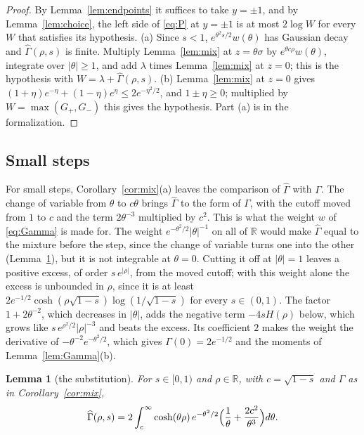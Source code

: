 \documentclass[12pt]{amsart}
\newtheorem{lemma}[theorem]{Lemma}
\theoremstyle{definition}
\numberwithin{equation}{section}
\newcommand{\R}{\mathbb{R}}
\newcommand{\Ghat}{\widehat{\Gamma}}
\newcommand{\leanmap}[1]{\ignorespaces}
\newcommand{\mapnote}[1]{\ignorespaces}
\begin{document}
\begin{proof}
By Lemma~\ref{lem:endpoints} it suffices to take $y=\pm1$, and by Lemma~\ref{lem:choice}, the left side of \eqref{eq:P} at $y=\pm1$ is at most $2\log W$ for every $W$ that satisfies its hypothesis. (a) Since $s<1$, $e^{\theta^2s/2}w(\theta)$ has Gaussian decay and $\Ghat(\rho,s)$ is finite. Multiply Lemma~\ref{lem:mix} at $z=\theta\sigma$ by $e^{\theta c\rho}w(\theta)$, integrate over $|\theta|\ge1$, and add $\lambda$ times Lemma~\ref{lem:mix} at $z=0$; this is the hypothesis with $W=\lambda+\Ghat(\rho,s)$. (b) Lemma~\ref{lem:mix} at $z=0$ gives $(1+\eta)e^{-\eta}+(1-\eta)e^{\eta}\le2e^{-\eta^2/2}$, and $1\pm\eta\ge0$; multiplied by $W=\max(G_+,G_-)$ this gives the hypothesis. Part (a) is  in the formalization.
\end{proof}

\subsection{Small steps}\label{subsec:small}
For small steps, Corollary~\ref{cor:mix}(a) leaves the comparison of $\Ghat$ with $\Gamma$. The change of variable from $\theta$ to $c\theta$ brings $\Ghat$ to the form of $\Gamma$, with the cutoff moved from $1$ to $c$ and the term $2\theta^{-3}$ multiplied by $c^2$. This is what the weight $w$ of \eqref{eq:Gamma} is made for. The weight $e^{-\theta^2/2}|\theta|^{-1}$ on all of $\R$ would make $\Ghat$ equal to the mixture before the step, since the change of variable turns one into the other (Lemma~\ref{lem:excess}), but it is not integrable at $\theta=0$. Cutting it off at $|\theta|=1$ leaves a positive excess, of order $s\,e^{|\rho|}$, from the moved cutoff; with this weight alone the excess is unbounded in $\rho$, since it is at least $2e^{-1/2}\cosh(\rho\sqrt{1-s})\log(1/\sqrt{1-s})$ for every $s\in(0,1)$. The factor $1+2\theta^{-2}$, which decreases in $|\theta|$, adds the negative term $-4sH(\rho)$ below, which grows like $s\,e^{\rho^2/2}|\rho|^{-3}$ and beats the excess. Its coefficient $2$ makes the weight the derivative of $-\theta^{-2}e^{-\theta^2/2}$, which gives $\Gamma(0)=2e^{-1/2}$ and the moments of Lemma~\ref{lem:Gamma}(b).

\begin{lemma}[the substitution]\label{lem:excess}
\leanmap{RegretKappa.Upper.Ghat_subst}
\mapnote{Lean proves it in the normalization $\Gamma/2$.}
For $s\in[0,1)$ and $\rho\in\R$, with $c=\sqrt{1-s}$ and $\Ghat$ as in Corollary~\ref{cor:mix},
\[
\Ghat(\rho,s)=2\int_c^\infty\cosh(\theta\rho)\,e^{-\theta^2/2}\Bigl(\frac1\theta+\frac{2c^2}{\theta^3}\Bigr)d\theta .
\]
\end{lemma}
\end{document}
